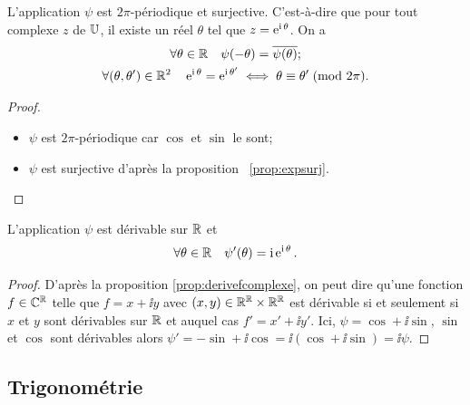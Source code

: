 \begin{prop}
    L'application \(\psi\) est  \(2\pi\)-périodique et surjective. C'est-à-dire 
    que pour tout complexe \(z\) de \(\mathbb{U}\), il existe un réel \(\theta\) tel que 
    \(z=\operatorname{e}^{\operatorname{i} \theta}\). On a
    \begin{gather}
        \forall \theta \in \mathbb{R} \quad \psi(-\theta)=\overline{\psi(\theta)};\\
        \forall (\theta, \theta') \in \mathbb{R}^2 \quad 
        \operatorname{e}^{\operatorname{i} \theta}=\operatorname{e}^{\operatorname{i} \theta'} \iff \theta \equiv \theta'\!\pmod {2\pi}.
    \end{gather}
\end{prop}
\begin{proof}
    \begin{itemize}
        \item \(\psi\) est \(2\pi\)-périodique car \(\cos\) et \(\sin\) le sont;
        \item \(\psi\) est surjective d'après la proposition~
\ref{prop:expsurj}.
    \end{itemize}
\end{proof}
\begin{prop}
    L'application \(\psi\) est dérivable sur \(\mathbb{R}\) et
    \begin{equation}
        \forall \theta \in \mathbb{R} \quad \psi'(\theta)=\operatorname{i} \operatorname{e}^{\operatorname{i} \theta}.
    \end{equation}
\end{prop}
\begin{proof}
    D'après la proposition
\ref{prop:derivefcomplexe}, on peut dire qu'une 
    fonction \(f \in \mathbb{C}^{\mathbb{R}}\) telle que \(f=x+\ii y\) avec \((x,y) \in \mathbb{R}^{\mathbb{R}} 
    \times \mathbb{R}^{\mathbb{R}}\) est dérivable si et seulement si \(x\) et \(y\) sont 
    dérivables sur \(\mathbb{R}\) et auquel cas \(f'=x' +\ii y'\). Ici, \(\psi=\cos +\ii 
    \sin\), \(\sin\) et \(\cos\) sont dérivables alors \(\psi'=-\sin + \ii 
    \cos=\ii (\cos +\ii \sin)=\ii \psi\).
\end{proof}
\subsection{Trigonométrie}
\label{subsec:complexestrigo}
